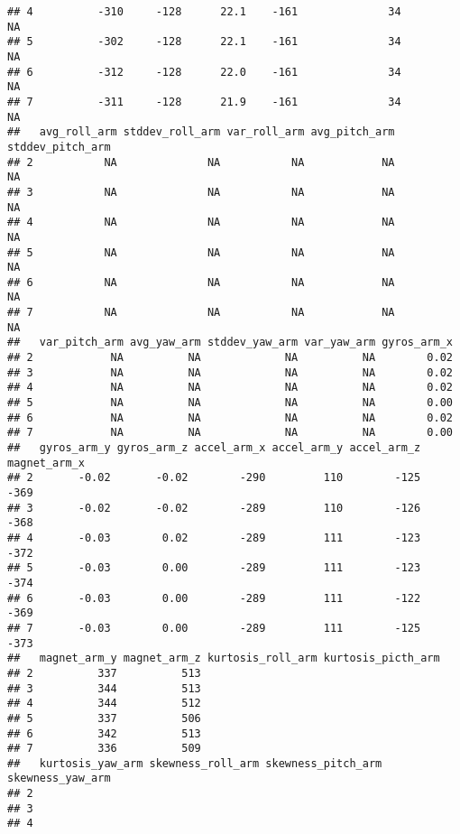 \documentclass[]{article}
\begin{document}
\begin{verbatim}
## 4          -310     -128      22.1    -161              34            NA
## 5          -302     -128      22.1    -161              34            NA
## 6          -312     -128      22.0    -161              34            NA
## 7          -311     -128      21.9    -161              34            NA
##   avg_roll_arm stddev_roll_arm var_roll_arm avg_pitch_arm stddev_pitch_arm
## 2           NA              NA           NA            NA               NA
## 3           NA              NA           NA            NA               NA
## 4           NA              NA           NA            NA               NA
## 5           NA              NA           NA            NA               NA
## 6           NA              NA           NA            NA               NA
## 7           NA              NA           NA            NA               NA
##   var_pitch_arm avg_yaw_arm stddev_yaw_arm var_yaw_arm gyros_arm_x
## 2            NA          NA             NA          NA        0.02
## 3            NA          NA             NA          NA        0.02
## 4            NA          NA             NA          NA        0.02
## 5            NA          NA             NA          NA        0.00
## 6            NA          NA             NA          NA        0.02
## 7            NA          NA             NA          NA        0.00
##   gyros_arm_y gyros_arm_z accel_arm_x accel_arm_y accel_arm_z magnet_arm_x
## 2       -0.02       -0.02        -290         110        -125         -369
## 3       -0.02       -0.02        -289         110        -126         -368
## 4       -0.03        0.02        -289         111        -123         -372
## 5       -0.03        0.00        -289         111        -123         -374
## 6       -0.03        0.00        -289         111        -122         -369
## 7       -0.03        0.00        -289         111        -125         -373
##   magnet_arm_y magnet_arm_z kurtosis_roll_arm kurtosis_picth_arm
## 2          337          513                                     
## 3          344          513                                     
## 4          344          512                                     
## 5          337          506                                     
## 6          342          513                                     
## 7          336          509                                     
##   kurtosis_yaw_arm skewness_roll_arm skewness_pitch_arm skewness_yaw_arm
## 2                                                                       
## 3                                                                       
## 4                                                                       

\end{verbatim}
\end{document}
